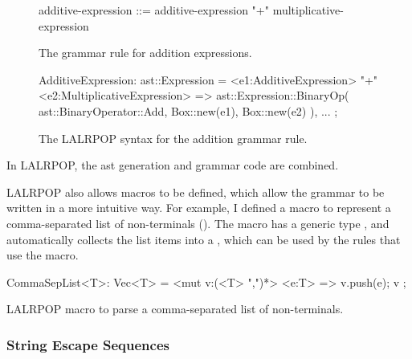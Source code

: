 \documentclass[00-main.tex]{subfiles}
\begin{document}
\begin{listing}[!ht]
  \begin{subfigure}[t]{\textwidth}
    \begin{GrammarListing}
      additive-expression ::= additive-expression "+" multiplicative-expression
    \end{GrammarListing}
    \caption{The grammar rule for addition expressions.}
  \end{subfigure}
  \par\medskip %
  \begin{subfigure}[t]{\textwidth}
    \begin{RustListing}
      AdditiveExpression: ast::Expression = {
          <e1:AdditiveExpression> "+" <e2:MultiplicativeExpression>
              => ast::Expression::BinaryOp(
                  ast::BinaryOperator::Add,
                  Box::new(e1),
                  Box::new(e2)
              ),
          ...
      };
    \end{RustListing}
    \caption{The LALRPOP syntax for the addition grammar rule.}
  \end{subfigure}
  \caption{In LALRPOP, the \gls{ast} generation and grammar code are combined.}
  \label{lst:AST generation code example}
\end{listing}

LALRPOP also allows macros to be defined, which allow the grammar to be written in a more intuitive way.
For example, I defined a macro to represent a comma-separated list of non-terminals ().
The macro has a generic type , and automatically collects the list items into a , which can be used by the rules that use the macro.

\begin{listing}[!ht]
  \begin{RustListing}
    CommaSepList<T>: Vec<T> = {
        <mut v:(<T> ",")*> <e:T> => {
            v.push(e);
            v
        }
    };
  \end{RustListing}
  \caption{LALRPOP macro to parse a comma-separated list of non-terminals.}
  \label{lst:parser macro for comma-separated list}
\end{listing}

\subsubsection{String Escape Sequences}
\end{document}
